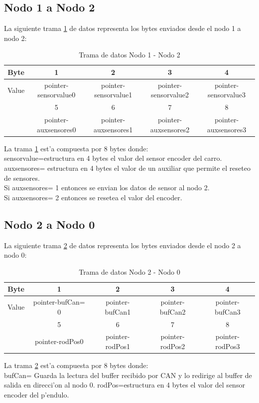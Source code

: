 \subsection{Nodo 1 a Nodo 2}
La siguiente trama \ref{tabla:n1n2} de datos representa los bytes enviados desde el nodo 1 a nodo 2:
\begin{table}[htbp]
\begin{center}
\begin{tabular}{c c c c c}
Byte&1&2&3&4\\
\hline
Value & pointer-sensorvalue0 & pointer-sensorvalue1 & pointer-sensorvalue2 & pointer-sensorvalue3\\
\hline
&5&6&7&8\\
\hline
& pointer-auxsensores0 &  pointer-auxsensores1 & pointer-auxsensores2 & pointer-auxsensores3\\

\end{tabular}
\caption{Trama de datos Nodo 1 - Nodo 2}
\label{tabla:n1n2}
\end{center}
\end{table}
La trama \ref{tabla:n1n2} est'a compuesta por 8 bytes donde:\\
sensorvalue=estructura en 4 bytes el valor del sensor encoder del carro.\\
auxsensores= estructura en 4 bytes el valor de un auxiliar que permite el reseteo de sensores.\\
					Si auxsensores= 1 entonces se envian los datos de sensor al nodo 2.\\
					Si auxsensores= 2 entonces se resetea el valor del encoder.\\	
					
					
\subsection{Nodo 2 a Nodo 0}
La siguiente trama \ref{tabla:n2n0} de datos representa los bytes enviados desde el nodo 2 a nodo 0:
\begin{table}[htbp]
\begin{center}
\begin{tabular}{c c c c c}
Byte&1&2&3&4\\
\hline
Value & pointer-bufCan= 0 & pointer-bufCan1 & pointer-bufCan2 & pointer-bufCan3\\
\hline
&5&6&7&8\\
\hline
& pointer-rodPos0 &  pointer-rodPos1 & pointer-rodPos2 & pointer-rodPos3\\

\end{tabular}
\caption{Trama de datos Nodo 2 - Nodo 0}
\label{tabla:n2n0}
\end{center}
\end{table}
La trama \ref{tabla:n2n0} est'a compuesta por 8 bytes donde:\\
bufCan= Guarda la lectura del buffer recibido por CAN y lo redirige al buffer de salida en direcci'on al nodo 0.
rodPos=estructura en 4 bytes el valor del sensor encoder del p'endulo.\\
																											